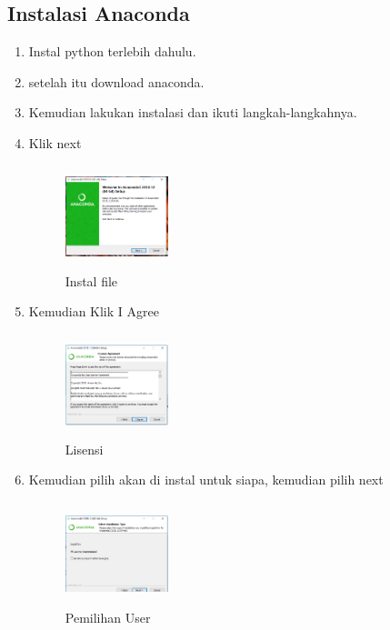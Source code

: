 \subsection{Instalasi Anaconda}
\begin{enumerate}
    \item Instal python terlebih dahulu.
    \item setelah itu download anaconda.
    \item Kemudian lakukan instalasi dan ikuti langkah-langkahnya.
    \item Klik next
    \begin{figure}[!htbp]
        \centering
        \includegraphics[width=3cm,height=3cm]{figures/dua.png}
        \caption{Instal file}
        \label{awal}
        \end{figure}

    \item Kemudian Klik I Agree
    \begin{figure}[!htbp]
        \centering
        \includegraphics[width=3cm,height=3cm]{figures/tiga.png}
        \caption{Lisensi}
        \label{License}
        \end{figure}

    \item Kemudian pilih akan di instal untuk siapa, kemudian pilih next
    \begin{figure}[!htbp]
        \centering
        \includegraphics[width=3cm,height=3cm]{figures/empat.png}
        \caption{Pemilihan User}
        \label{User}
        \end{figure}


\end{enumerate}
